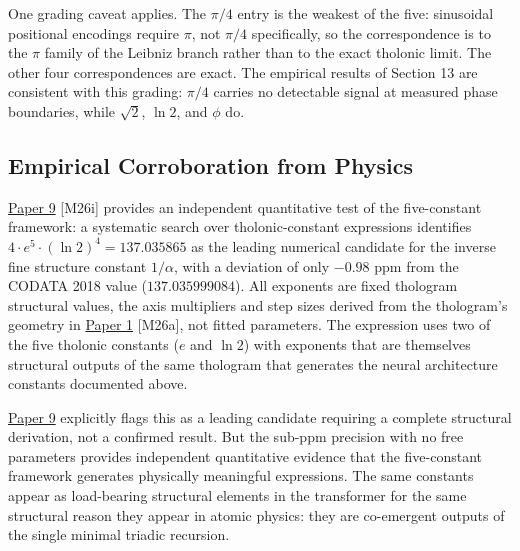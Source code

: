 \documentclass[12pt]{article}
\begin{document}
One grading caveat applies. The \(\pi/4\) entry is the weakest of the
five: sinusoidal positional encodings require \(\pi\), not \(\pi/4\)
specifically, so the correspondence is to the \(\pi\) family of the
Leibniz branch rather than to the exact tholonic limit. The other four
correspondences are exact. The empirical results of Section 13 are
consistent with this grading: \(\pi/4\) carries no detectable signal at
measured phase boundaries, while \(\sqrt{2}\), \(\ln 2\), and \(\phi\)
do.

\subsection{Empirical Corroboration from Physics}\label{empirical-corroboration-from-physics}

\href{https://github.com/baardev/truevalue/blob/main/docnav/Research/papers/9_tholonic-model-standard-model-alternative/9_tholonic-model-standard-model-alternative.pdf}{Paper
9} {[}M26i{]} provides an independent quantitative test of the
five-constant framework: a systematic search over tholonic-constant
expressions identifies \(4 \cdot e^5 \cdot (\ln 2)^4 = 137.035865\) as
the leading numerical candidate for the inverse fine structure constant
\(1/\alpha\), with a deviation of only \(-0.98\) ppm from the CODATA
2018 value (\(137.035999084\)). All exponents are fixed thologram
structural values, the axis multipliers and step sizes derived from the
thologram's geometry in
\href{https://github.com/baardev/truevalue/blob/main/docnav/Research/papers/1_recursive-tholonic-five-constants/1_recursive-tholonic-five-constants.pdf}{Paper
1} {[}M26a{]}, not fitted parameters. The expression uses two of the
five tholonic constants (\(e\) and \(\ln 2\)) with exponents that are
themselves structural outputs of the same thologram that generates the
neural architecture constants documented above.

\href{https://github.com/baardev/truevalue/blob/main/docnav/Research/papers/9_tholonic-model-standard-model-alternative/9_tholonic-model-standard-model-alternative.pdf}{Paper
9} explicitly flags this as a leading candidate requiring a complete
structural derivation, not a confirmed result. But the sub-ppm precision
with no free parameters provides independent quantitative evidence that
the five-constant framework generates physically meaningful expressions.
The same constants appear as load-bearing structural elements in the
transformer for the same structural reason they appear in atomic
physics: they are co-emergent outputs of the single minimal triadic
recursion.
\end{document}

